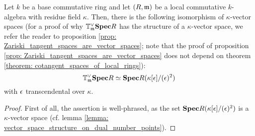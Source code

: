             \begin{theorem} \label{theorem: cotangent_spaces_of_local_rings}  
                Let $k$ be a base commutative ring and let $(R, \mathfrak{m})$ be a local commutative $k$-algebra with residue field $\kappa$. Then, there is the following isomorphism of $\kappa$-vector spaces (for a proof of why $\mathbb{T}^{\vee}_{\mathfrak{m}}\mathbf{Spec} R$ has the structure of a $\kappa$-vector space, we refer the reader to proposition \ref{prop: Zariski_tangent_spaces_are_vector_spaces}; note that the proof of proposition \ref{prop: Zariski_tangent_spaces_are_vector_spaces} does not depend on theorem \ref{theorem: cotangent_spaces_of_local_rings}):
                    $$\mathbb{T}^{\vee}_{\mathfrak{m}}\mathbf{Spec} R \simeq \mathbf{Spec} R(\kappa[\epsilon]/(\epsilon)^2)$$
                with $\epsilon$ transcendental over $\kappa$.
            \end{theorem}
                \begin{proof}
                    First of all, the assertion is well-phrased, as the set $\mathbf{Spec} R(\kappa[\epsilon]/(\epsilon)^2)$ is a $\kappa$-vector space (cf. lemma \ref{lemma: vector_space_structure_on_dual_number_points}). 
                \end{proof}
